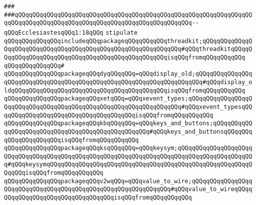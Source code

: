\verb|###|\newline
\verb|###qQQqqQQqqQQqqQQqqQQqqQQqqQQqqQQqqQQqqQQqqQQqqQQqqQQqqQQqqQQqqQQqqQQqqQQqqQQqqQQqqQQqqQQqqQQqqQQqqQQqqQQqqQQqqQQqqQQqqQQq--qQQqEcclesiastesqQQq1:18qQQq|\newline
\newline
\newline
\verb|stipulate|\newline
\verb|qQQqqQQqqQQqqQQqincludeqQQqpackageqQQqqQQqqQQqthreadkit;qQQqqQQqqQQqqQQqqQQqqQQqqQQqqQQqqQQqqQQqqQQqqQQqqQQqqQQqqQQqqQQq#qQQqthreadkitqQQqqQQqqQQqqQQqqQQqqQQqqQQqqQQqqQQqqQQqqQQqqQQqqQQqisqQQqfromqQQqqQQqqQQq|\newline
\verb|qQQqqQQqqQQqqQQq#|\newline
\verb|qQQqqQQqqQQqqQQqpackageqQQqdyqQQqqQQq=qQQqdisplay_old;qQQqqQQqqQQqqQQqqQQqqQQqqQQqqQQqqQQqqQQqqQQqqQQqqQQqqQQqqQQqqQQqqQQqqQQq#qQQqdisplay_oldqQQqqQQqqQQqqQQqqQQqqQQqqQQqqQQqqQQqqQQqqQQqisqQQqfromqQQqqQQqqQQq|\newline
\verb|qQQqqQQqqQQqqQQqpackageqQQqxetqQQq=qQQqxevent_types;qQQqqQQqqQQqqQQqqQQqqQQqqQQqqQQqqQQqqQQqqQQqqQQqqQQqqQQqqQQqqQQqqQQq#qQQqxevent_typesqQQqqQQqqQQqqQQqqQQqqQQqqQQqqQQqqQQqqQQqisqQQqfromqQQqqQQqqQQq|\newline
\verb|qQQqqQQqqQQqqQQqpackageqQQqkbqQQqqQQq=qQQqkeys_and_buttons;qQQqqQQqqQQqqQQqqQQqqQQqqQQqqQQqqQQqqQQqqQQqqQQqqQQq#qQQqkeys_and_buttonsqQQqqQQqqQQqqQQqqQQqqQQqisqQQqfromqQQqqQQqqQQq|\newline
\verb|qQQqqQQqqQQqqQQqpackageqQQqksqQQqqQQq=qQQqkeysym;qQQqqQQqqQQqqQQqqQQqqQQqqQQqqQQqqQQqqQQqqQQqqQQqqQQqqQQqqQQqqQQqqQQqqQQqqQQqqQQqqQQqqQQqqQQq#qQQqkeysymqQQqqQQqqQQqqQQqqQQqqQQqqQQqqQQqqQQqqQQqqQQqqQQqqQQqqQQqqQQqqQQqisqQQqfromqQQqqQQqqQQq|\newline
\verb|qQQqqQQqqQQqqQQqpackageqQQqv2wqQQq=qQQqvalue_to_wire;qQQqqQQqqQQqqQQqqQQqqQQqqQQqqQQqqQQqqQQqqQQqqQQqqQQqqQQqqQQqqQQq#qQQqvalue_to_wireqQQqqQQqqQQqqQQqqQQqqQQqqQQqqQQqqQQqisqQQqfromqQQqqQQqqQQq|\newline
